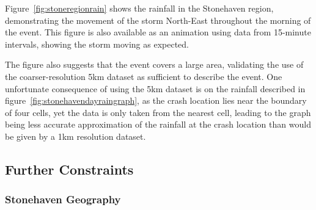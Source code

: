 \documentclass[12pt,a4paper]{report}
\begin{document}
Figure~\ref{fig:stoneregionrain} shows the rainfall in the Stonehaven region,
    demonstrating the movement of the storm North-East throughout the morning of the event.
This figure is also available as an animation using data from 15-minute intervals,
    showing the storm moving as expected.

The figure also suggests that the event covers a large area,
    validating the use of the coarser-resolution 5km dataset as sufficient to describe the event.
One unfortunate consequence of using the 5km dataset is on the rainfall described in figure~\ref{fig:stonehavendayraingraph},
    as the crash location lies near the boundary of four cells, yet the data is only taken from the nearest cell,
    leading to the graph being less accurate approximation of the rainfall at the crash location than would be given by a 1km resolution dataset.

\subsection{Further Constraints}\label{subsec:furthercons}

\subsubsection{Stonehaven Geography}
\end{document}
